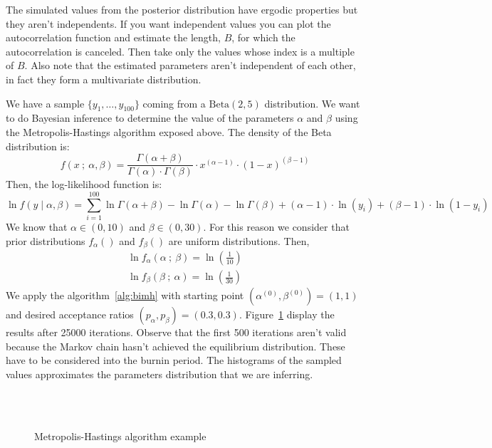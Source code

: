 \documentclass[11pt,fleqn]{book} %
\begin{document}
The simulated values from the posterior distribution have ergodic properties but
they aren't independents. If you want independent values you can plot the 
autocorrelation function and estimate the length, $B$, for which the autocorrelation 
is canceled. Then take only the values whose index is a multiple of $B$. Also
note that the estimated parameters aren't independent of each other, in fact 
they form a multivariate distribution.

\begin{example}
	We have a sample $\{y_1,\dots,y_{100}\}$ coming from a $\text{Beta}(2,5)$ 
	distribution. We want to do Bayesian inference to determine the value of the 
	parameters $\alpha$ and $\beta$ using the Metropolis-Hastings algorithm exposed 
	above. The density of the Beta distribution is:
	\begin{displaymath}
		f(x\ ;\ \alpha, \beta) = 
		\frac{\Gamma(\alpha+\beta)}{\Gamma(\alpha) \cdot \Gamma(\beta)} 
		\cdot x^{(\alpha-1)} \cdot (1-x)^{(\beta-1)}
	\end{displaymath}
	Then, the log-likelihood function is:
	\begin{displaymath}
		\ln f(y \mid \alpha, \beta) = 
		\displaystyle \sum_{i=1}^{100} 
		\ln \Gamma(\alpha+\beta) - \ln \Gamma(\alpha) - \ln \Gamma(\beta) +
		(\alpha-1) \cdot \ln(y_i) + (\beta-1) \cdot \ln(1-y_i)
	\end{displaymath}
	We know that $\alpha \in (0,10)$ and $\beta \in (0,30)$. For this reason we 
	consider that prior distributions $f_{\alpha}()$ and $f_{\beta}()$ are 
	uniform distributions. Then,
	\begin{displaymath}
		\begin{array}{l}
			\ln f_{\alpha}(\alpha \ ;\ \beta) = \ln(\frac{1}{10})
			\\
			\ln f_{\beta}(\beta \ ;\ \alpha) = \ln(\frac{1}{30})
		\end{array}
	\end{displaymath}
	We apply the algorithm~\ref{alg:bimh} with starting point 
	$\left(\alpha^{(0)},\beta^{(0)}\right)=(1,1)$ and 
	desired acceptance ratios $(p_{\alpha},p_{\beta})=(0.3,0.3)$.
	Figure~\ref{fig:mhbd} display the results after 25000 iterations.
	Observe that the first 500 iterations aren't valid because the Markov 
	chain hasn't achieved the equilibrium distribution. These have to be 
	considered into the burnin period. The histograms of the sampled values
	approximates the parameters distribution that we are inferring.
	\begin{figure}[!ht]
		\centering
		\\
		\\
		\caption{Metropolis-Hastings algorithm example}
		\label{fig:mhbd}
	\end{figure}
\end{example}
\end{document}
